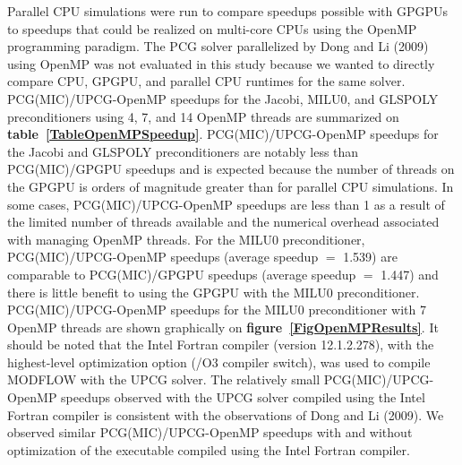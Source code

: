 \documentclass[12pt]{article}
\begin{document}
Parallel CPU simulations were run to compare speedups possible with GPGPUs to speedups that could be realized on multi-core CPUs using the OpenMP programming paradigm. \color{blue} The PCG solver parallelized by Dong and Li (2009) using OpenMP was not evaluated in this study because we wanted to directly compare CPU, GPGPU, and parallel CPU runtimes for the same solver. \color{black}PCG(MIC)/UPCG-OpenMP speedups for the Jacobi, MILU0, and GLSPOLY preconditioners using 4, 7, and 14 OpenMP threads are summarized on \textbf{table~\ref{TableOpenMPSpeedup}}. PCG(MIC)/UPCG-OpenMP speedups for the Jacobi and GLSPOLY preconditioners are notably less than PCG(MIC)/GPGPU speedups and is expected because the number of threads on the GPGPU is orders of magnitude greater than for parallel CPU simulations. \color{cyan} In some cases, PCG(MIC)/UPCG-OpenMP speedups are less than 1 as a result of the limited number of threads available and the numerical overhead associated with managing OpenMP threads. \color{black}For the MILU0 preconditioner, PCG(MIC)/UPCG-OpenMP speedups (average speedup $=$ 1.539) are comparable to PCG(MIC)/GPGPU speedups (average speedup $=$ 1.447) and there is little benefit to using the GPGPU with the MILU0 preconditioner. PCG(MIC)/UPCG-OpenMP speedups for the MILU0 preconditioner with 7 OpenMP threads are shown graphically on \textbf{figure~\ref{FigOpenMPResults}}. It should be noted that the Intel Fortran compiler (version 12.1.2.278), with the highest-level optimization option (/O3 compiler switch), was used to compile MODFLOW with the UPCG solver. The relatively small PCG(MIC)/UPCG-OpenMP speedups observed with the UPCG solver compiled using the Intel Fortran compiler is consistent with the observations of Dong and Li (2009). \color{blue} We observed similar PCG(MIC)/UPCG-OpenMP speedups with and without optimization of the executable compiled using the Intel Fortran compiler.\color{black}
\end{document}
